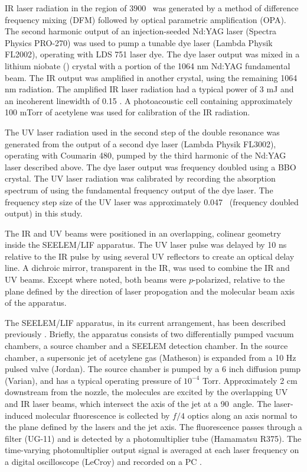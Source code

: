 \documentclass[12pt]{mitthesis}
\begin{document}
IR laser radiation in the region of 3900 \rcm\ was generated by a
method of difference frequency mixing (DFM) followed by optical
parametric amplification (OPA).  The second harmonic output of an
injection-seeded Nd:YAG laser (Spectra Physics PRO-270) was used to
pump a tunable dye laser (Lambda Physik FL2002), operating with LDS
751 laser dye.  The dye laser output was mixed in a lithium niobate
() crystal with a portion of the 1064 nm Nd:YAG fundamental
beam.  The IR output was amplified in another  crystal,
using the remaining 1064 nm radiation.  The amplified IR laser
radiation had a typical power of 3 mJ and an incoherent linewidth of
0.15 \rcm.  A photoacoustic cell containing approximately 100 mTorr of
acetylene was used for calibration of the IR radiation.

The UV laser radiation used in the second step of the double resonance
was generated from the output of a second dye laser (Lambda Physik
FL3002), operating with Coumarin 480, pumped by the third harmonic of
the Nd:YAG laser described above.  The dye laser output was frequency
doubled using a BBO crystal.  The UV laser radiation was calibrated by
recording the absorption spectrum of  using the fundamental
frequency output of the dye laser.  The frequency step size of the UV
laser was approximately 0.047 \rcm\ (frequency doubled output) in this
study.

The IR and UV beams were positioned in an overlapping, colinear
geometry inside the SEELEM/LIF apparatus.  The UV laser pulse was
delayed by 10 ns relative to the IR pulse by using several UV
reflectors to create an optical delay line.  A dichroic mirror,
transparent in the IR, was used to combine the IR and UV beams.
Except where noted, both beams were $p$-polarized, relative to the
plane defined by the direction of laser propogation and the molecular
beam axis of the apparatus.

The SEELEM/LIF apparatus, in its current arrangement, has been
described previously \cite{cunningham-thesis, altunata-thesis,
  altunata02, mishra04}.  Briefly, the apparatus consists
of two differentially pumped vacuum chambers, a source chamber and a
SEELEM detection chamber.  In the source chamber, a supersonic jet of
acetylene gas (Matheson) is expanded from a 10 Hz pulsed valve
(Jordan).  The source chamber is pumped by a 6 inch diffusion pump
(Varian), and has a typical operating pressure of $10^{-4}$ Torr.
Approximately 2 cm downstream from the nozzle, the molecules are
excited by the overlapping UV and IR laser beams, which intersect the
axis of the jet at a 90\degrees\ angle.  The laser-induced molecular
fluorescence is collected by $f/4$ optics along an axis normal to the
plane defined by the lasers and the jet axis.  The fluorescence passes
through a filter (UG-11) and is detected by a photomultiplier tube
(Hamamatsu R375).  The time-varying photomultiplier output signal is
averaged at each laser frequency on a digital oscilloscope (LeCroy)
and recorded on a PC .
\end{document}
